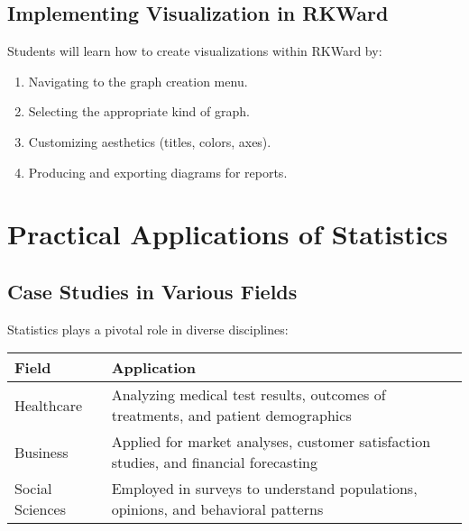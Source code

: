 \documentclass[
  letterpaper,
  DIV=11,
  numbers=noendperiod]{scrreprt}
\providecommand{\tightlist}{%
  \setlength{\itemsep}{0pt}\setlength{\parskip}{0pt}}
\begin{document}
\section{Implementing Visualization in
RKWard}\label{implementing-visualization-in-rkward}

Students will learn how to create visualizations within RKWard by:

\begin{enumerate}
\def\labelenumi{\arabic{enumi}.}
\tightlist
\item
  Navigating to the graph creation menu.
\item
  Selecting the appropriate kind of graph.
\item
  Customizing aesthetics (titles, colors, axes).
\item
  Producing and exporting diagrams for reports.
\end{enumerate}


\chapter{Practical Applications of
Statistics}\label{practical-applications-of-statistics}

\section{Case Studies in Various
Fields}\label{case-studies-in-various-fields}

Statistics plays a pivotal role in diverse disciplines:

\begin{longtable}[]{@{}
  >{\raggedright\arraybackslash}p{}
  >{\raggedright\arraybackslash}p{}@{}}
\toprule\noalign{}
\begin{minipage}[b]{\linewidth}\raggedright
Field
\end{minipage} & \begin{minipage}[b]{\linewidth}\raggedright
Application
\end{minipage} \\
\midrule\noalign{}
\endhead
\bottomrule\noalign{}
\endlastfoot
Healthcare & Analyzing medical test results, outcomes of treatments, and
patient demographics \\
Business & Applied for market analyses, customer satisfaction studies,
and financial forecasting \\
Social Sciences & Employed in surveys to understand populations,
opinions, and behavioral patterns \\
\end{longtable}
\end{document}
